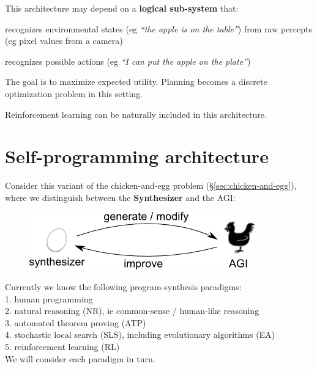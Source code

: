This architecture may depend on a \textbf{logical sub-system} that:
\begin{compactenum-}
\item  recognizes environmental states (eg \textit{``the apple is on the table''}) from raw percepts (eg pixel values from a camera)
\item  recognizes possible actions (eg \textit{``I can put the apple on the plate''})
\end{compactenum-}

The goal is to maximize expected utility.  Planning becomes a discrete optimization problem in this setting.

Reinforcement learning  can be naturally included in this architecture.

\section{Self-programming architecture}
\label{sec:self-programming-architecture}

Consider this variant of the chicken-and-egg problem (\S\ref{sec:chicken-and-egg}), where we distinguish between the \textbf{Synthesizer} and the AGI:
\begin{figure}[H]
\centering
\includegraphics{self-programming-architecture.png}
\vspace{-0.5cm}
\end{figure}

Currently we know the following program-synthesis paradigms:\\
1.  human programming\\
2.  natural reasoning (NR), ie common-sense / human-like reasoning\\
3.  automated theorem proving (ATP)\\
4.  stochastic local search (SLS), including evolutionary algorithms (EA)\\
5.  reinforcement learning (RL) \\
We will consider each paradigm in turn.

